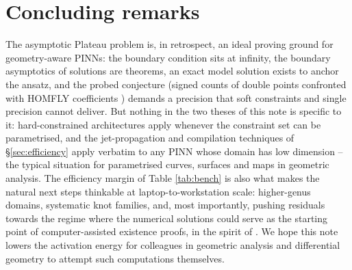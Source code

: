 \documentclass[oneside,british]{amsart}
\numberwithin{equation}{section}
\numberwithin{figure}{section}
\theoremstyle{plain}
\numberwithin{thm}{section}
\theoremstyle{plain}
\theoremstyle{plain}
\theoremstyle{definition}
\theoremstyle{remark}
\begin{document}
\section{Concluding remarks}\label{sec:conclusion}

The asymptotic Plateau problem is, in retrospect, an ideal proving
ground for geometry-aware PINNs: the boundary condition sits at
infinity, the boundary asymptotics of solutions are theorems, an exact
model solution exists to anchor the ansatz, and the probed
conjecture (signed counts of double points confronted with HOMFLY
coefficients \cite{FineKnots}) demands a precision that soft
constraints and single precision cannot deliver. But nothing in the two
theses of this note is specific to it: hard-constrained architectures
apply whenever the constraint set can be parametrised, and the
jet-propagation and compilation techniques of \S\ref{sec:efficiency}
apply verbatim to any PINN whose domain has low dimension -- the
typical situation for parametrised curves, surfaces and maps in
geometric analysis. The efficiency margin of Table \ref{tab:bench} is
also what makes the natural next steps thinkable at
laptop-to-workstation scale: higher-genus domains, systematic knot
families, and, most importantly, pushing residuals towards the regime where the numerical solutions could serve as the
starting point of computer-assisted existence proofs, in the spirit of
\cite{gomez2019computer,wang2025discoveryunstablesingularities,platt2026nonuniquenesssymmetriesnirenbergproblem}.
We hope this note lowers the activation energy for colleagues in
geometric analysis and differential geometry to attempt such computations themselves.

\begin{small}


\end{small}
\end{document}

